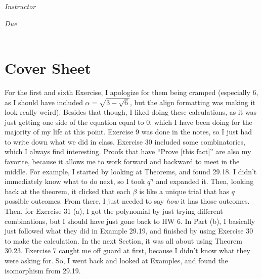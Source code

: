 \documentclass[12pt, oneside]{book}
\begin{document}
\begin{titlepage}
\begin{center}
\begin{large}
            \vspace*{1\baselineskip}

            \textit{Instructor} \\[1ex] %
            \professor

            \vspace*{1\baselineskip}

            \textit{Due}\\[1ex]
            {\scshape  \finaldate} \\[0.3\baselineskip] %

            \thispagestyle{empty}

        \end{large}
    \end{center}
\end{titlepage}


\section*{Cover Sheet}

For the first and sixth Exercise, I apologize for them being cramped (especially 6, as I should have included \(\alpha = \sqrt{3 - \sqrt{6}}\), but the align formatting was making it look really weird). Besides that though, I liked doing these calculations, as it was just getting one side of the equation equal to 0, which I have been doing for the majority of my life at this point. Exercise 9 was done in the notes, so I just had to write down what we did in class. Exercise 30 included some combinatorics, which I always find interesting. Proofs that have ``Prove [this fact]'' are also my favorite, because it allows me to work forward and backward to meet in the middle. For example, I started by looking at Theorems, and found 29.18. I didn't immediately know what to do next, so I took \(q^{n}\) and expanded it. Then, looking back at the theorem, it clicked that each \(\beta\) is like a unique trial that has \(q\) possible outcomes. From there, I just needed to say \textit{how} it has those outcomes. Then, for Exercise 31 (a), I got the polynomial by just trying different combinations, but I should have just gone back to HW 6. In Part (b), I basically just followed what they did in Example 29.19, and finished by using Exercise 30 to make the calculation. In the next Section, it was all about using Theorem 30.23. Exercise 7 caught me off guard at first, because I didn't know what they were asking for. So, I went back and looked at Examples, and found the isomorphism from 29.19.
\end{document}
